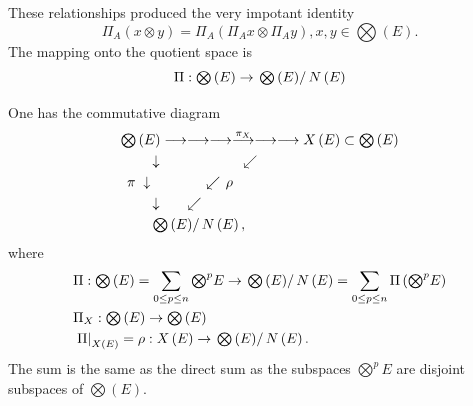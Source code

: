 \documentclass[aps,preprint]{revtex4}%
\begin{document}
These relationships produced the very impotant identity%
\begin{equation}
\Pi_{A}\left(  x\otimes y\right)  =\Pi_{A}\left(  \Pi_{A}x\otimes\Pi
_{A}y\right)  ,x,y\in%
{\textstyle\bigotimes}
\left(  E\right)  .
\end{equation}
The mapping onto the quotient space is
\begin{equation}
\Pi:%
{\textstyle\bigotimes}
\left(  E\right)  \rightarrow\left.
{\textstyle\bigotimes}
\left(  E\right)  \right/  N\left(  E\right)
\end{equation}


One has the commutative diagram%
\begin{align}
&
{\textstyle\bigotimes}
\left(  E\right)  \longrightarrow\longrightarrow\longrightarrow\overset{\pi
_{X}}{\longrightarrow}\longrightarrow\longrightarrow X\left(  E\right)
\subset%
{\textstyle\bigotimes}
\left(  E\right) \\
&  \qquad\downarrow\qquad\qquad\qquad\swarrow\\
&  \,\left.  \pi\right.  \,\downarrow\qquad\qquad\swarrow\left.  \rho\right.
\\
&  \qquad\downarrow\qquad\swarrow\\
&  \qquad\left.
{\textstyle\bigotimes}
\left(  E\right)  \right/  N\left(  E\right)  ,
\end{align}
where%
\begin{align}
&  \Pi:%
{\textstyle\bigotimes}
\left(  E\right)  =\sum_{0\leq p\leq n}%
{\textstyle\bigotimes\nolimits^{p}}
E\rightarrow\left.
{\textstyle\bigotimes}
\left(  E\right)  \right/  N\left(  E\right)  =\sum_{0\leq p\leq n}\Pi\left(
{\textstyle\bigotimes\nolimits^{p}}
E\right) \\
&  \Pi_{X}:%
{\textstyle\bigotimes}
\left(  E\right)  \rightarrow%
{\textstyle\bigotimes}
\left(  E\right) \\
&  \left.  \Pi\right\vert _{X\left(  E\right)  }=\rho:X\left(  E\right)
\rightarrow\left.
{\textstyle\bigotimes}
\left(  E\right)  \right/  N\left(  E\right)  .
\end{align}
The sum is the same as the direct sum as the subspaces $%
{\textstyle\bigotimes\nolimits^{p}}
E$ are disjoint subspaces of $%
{\textstyle\bigotimes}
\left(  E\right)  .$
\end{document}
